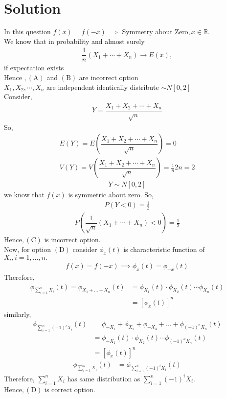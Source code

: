 \documentclass[journal,12pt,twocolumn]{IEEEtran}
\begin{document}
\section{Solution}
In this question $f(x)=f(-x)\implies$ Symmetry about Zero$,x\in\mathbb{R}.$\\
We know that in probability and almost surely
\begin{align}
\dfrac{1}{n}\left(X_{1}+\cdots+X_{n}\right) \rightarrow E(x),
\end{align}
if expectation exists\\
Hence $,(\mathrm{A})$ and $(\mathrm{B})$ are incorrect option\\
$X_{1}, X_{2}, \cdots,X_n$ are independent identically distribute $\sim N[0,2]$\\
Consider,
\begin{align}
Y=\dfrac{X_{1}+ X_{2}+ \cdots + X_n}{\sqrt{n}}
\end{align}
So,
\begin{align}
E(Y)= E\left(\dfrac{X_{1}+ X_{2}+ \cdots+X_n}{\sqrt{n}}\right)= 0\\
V(Y)= V\left(\dfrac{X_{1}+ X_{2}+ \cdots+X_n}{\sqrt{n}}\right)= \frac{1}{n}2n=2
\end{align}
\begin{align}
Y \sim N[0,2]
\end{align}
we know that $f(x)$ is symmetric about zero. So,
\begin{align}
P(Y<0)=\frac{1}{2}
\end{align}
\begin{align}
P\left(\dfrac{1}{\sqrt{n}}\left(X_{1}+\cdots+X_{n}\right)<0\right)=\frac{1}{2}
\end{align}
Hence$,(\mathrm{C})$ is incorrect option.\\
Now, for option $(\mathrm{D})$ consider $\phi_{x}(t)$ is characteristic function of $X_{i}, i=1, \ldots, n.$
\begin{align}
f(x)=f(-x)\implies \phi_{x}(t)=\phi_{-x}(t)
\end{align}
Therefore,
\begin{align}
\phi_{\sum_{i=1}^{n}X_i}(t) = \phi_{X_{1}+\ldots +X_{n}}(t) &=\phi_{X_{1}}(t) \cdot \phi_{X_{2}}(t)\cdots\phi_{X_{n}}(t)\\
&=\left[\phi_{x}(t)\right]^{n}
\end{align}
similarly,
\begin{align}
\phi_{\sum_{i=1}^{n}(-1)^{i}X_i}(t) &= \phi_{-X_{1}}+\phi_{X_{2}}+\phi_{-X_{3}}+\ldots +\phi_{(-1)^{n}X_{n}}(t)\\
&=\phi_{-X_{1}}(t) \cdot \phi_{X_{2}}(t)\cdots\phi_{(-1)^{n}X_{n}}(t)\\
&=\left[\phi_{x}(t)\right]^{n}
\end{align}
\begin{align}
\phi_{\sum_{i=1}^{n}X_i}(t) &= \phi_{\sum_{i=1}^{n}(-1)^{i}X_i}(t)
\end{align}
Therefore, $\sum_{i=1}^{n} X_{i}$ has same distribution as $\sum_{i=1}^{n}(-1)^{i} X_{i}.$\\
Hence$,(\mathrm{D})$ is correct option.
\end{document}
